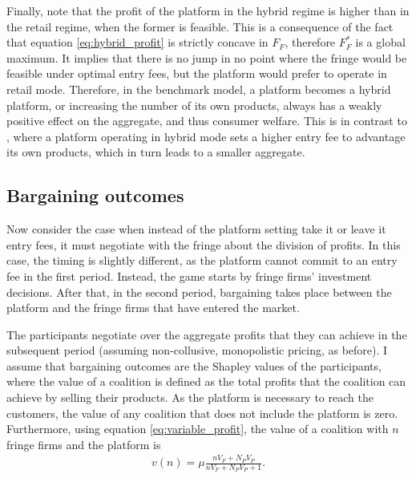 \documentclass[a4paper]{article}
\begin{document}
Finally, note that the profit of the platform in the hybrid regime is higher than in the retail regime, when the former is feasible.
This is a consequence of the fact that equation \eqref{eq:hybrid_profit} is strictly concave in $F_F$, therefore $F_F^*$ is a global maximum.
It implies that there is no jump in no point where the fringe would be feasible under optimal entry fees, but the platform would prefer to operate in retail mode.
Therefore, in the benchmark model, a platform becomes a hybrid platform, or increasing the number of its own products, always has a weakly positive effect on the aggregate, and thus consumer welfare.
This is in contrast to \textcite{anderson2021hybrid}, where a platform operating in hybrid mode sets a higher entry fee to advantage its own products, which in turn leads to a smaller aggregate.


\subsection{Bargaining outcomes}

Now consider the case when instead of the platform setting take it or leave it entry fees, it must negotiate with the fringe about the division of profits.
In this case, the timing is slightly different, as the platform cannot commit to an entry fee in the first period.
Instead, the game starts by fringe firms' investment decisions.
After that, in the second period, bargaining takes place between the platform and the fringe firms that have entered the market.


The participants negotiate over the aggregate profits that they can achieve in the subsequent period (assuming non-collusive, monopolistic pricing, as before).
I assume that bargaining outcomes are the Shapley values of the participants, where the value of a coalition is defined as the total profits that the coalition can achieve by selling their products.
As the platform is necessary to reach the customers, the value of any coalition that does not include the platform is zero.
Furthermore, using equation \eqref{eq:variable_profit}, the value of a coalition with $n$ fringe firms and the platform is
\begin{align*}
    v(n) = \mu \frac{n V_F + N_P V_P}{n V_F + N_P V_P + 1}.
\end{align*}
\end{document}
